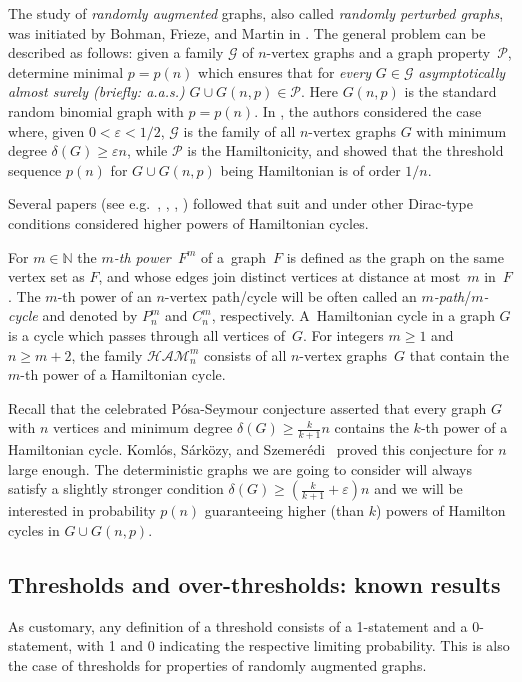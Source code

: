 \documentclass[reqno, 12pt]{amsart}
\numberwithin{equation}{section}
\numberwithin{figure}{section}
\let\epsilon=\varepsilon
\let\eps=\epsilon
\def\NN{{\mathds N}}
\newcommand{\cP}{\mathcal{P}}
\newcommand{\ham}{\mathcal{HAM}}
\theoremstyle{plain}
\theoremstyle{definition}
\begin{document}
The study of \emph{randomly augmented} graphs, also called \emph{randomly perturbed graphs}, was initiated by Bohman, Frieze, and Martin in \cite{BFM2003}. The general problem can be described as follows: given a family $\mathcal G$ of $n$-vertex graphs and a graph property~$\mathcal{P}$, determine minimal $p=p(n)$ which ensures that for \emph{every} $G\in\mathcal G$ \emph{asymptotically almost surely (briefly: a.a.s.)} $G\cup G(n,p)\in \mathcal{P}$. Here $G(n,p)$ is the standard random binomial graph with $p=p(n)$. In \cite{BFM2003}, the authors considered the case where, given $0<\epsilon<1/2$, $\mathcal G$ is the family of all $n$-vertex graphs $G$ with minimum degree $\delta(G)\geq \eps n$, while $\cP$ is the Hamiltonicity, and showed that the threshold sequence $p(n)$ for $G \cup G(n,p)$ being Hamiltonian is of order $1/n$.

Several papers (see e.g.~\cite{DRRS}, \cite{ADRRS}, \cite{BPSS2022}, \cite{ADR}) followed that suit and under other Dirac-type conditions considered higher powers of Hamiltonian cycles.

For $m\in\NN$ the \emph{$m$-th power~$F^m$} of a~graph~$F$ is defined as the graph on the same vertex set as $F$, and whose edges join distinct vertices at distance at most~$m$ in~$F$.
The $m$-th power of an $n$-vertex path/cycle will be often called an \emph{$m$-path}/\emph{$m$-cycle} and denoted by $P_n^m$ and $C_n^m$, respectively.
A~Hamiltonian cycle in a graph $G$ is a cycle which passes through all vertices of~$G$. For integers $m\ge1$ and $n\geq m+2$, the family $\ham_n^m$ consists of all $n$-vertex graphs~$G$ that contain the $m$-th power of a Hamiltonian cycle.

Recall that the celebrated P\'osa-Seymour conjecture asserted that every graph $G$ with $n$ vertices and minimum degree $\delta(G)\ge\tfrac k{k+1}n$ contains the $k$-th power of a Hamiltonian cycle.  Koml\'os, S\'ark\"ozy, and Szemer\'edi~\cite{KSS1996,KSS1998} proved this conjecture for $n$ large enough.   The deterministic graphs we are going to consider will always satisfy a slightly stronger condition $\delta(G)\ge\left(\tfrac k{k+1}+\eps\right)n$ and we will be interested in probability $p(n)$ guaranteeing higher (than $k$) powers of Hamilton cycles in $G\cup G(n,p)$.
	

\subsection{Thresholds and over-thresholds: known results}\label{known} As customary, any definition of a threshold consists of a 1-statement and a 0-statement, with 1 and 0 indicating the respective limiting probability. This is also the case of thresholds for properties of randomly augmented graphs.
\end{document}
